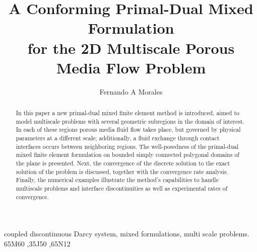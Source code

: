 \documentclass[3p]{elsarticle}
\begin{document}
\begin{frontmatter}

\title{A Conforming Primal-Dual Mixed Formulation \\
for the 
2D Multiscale Porous Media Flow Problem}

\author[mymainaddress]{Fernando A Morales } %



\address[mymainaddress]{Escuela de Matem\'aticas
Universidad Nacional de Colombia, Sede Medell\'in \\
Calle 59 A No 63-20 - Bloque 43, of 106,
Medell\'in - Colombia}




\begin{abstract}
In this paper a new primal-dual mixed finite element method is introduced, aimed to model multiscale problems with several geometric subregions in the domain of interest. In each of these regions porous media fluid flow takes place, but governed by physical parameters at a different scale; additionally, a fluid exchange through contact interfaces occurs between neighboring regions. The well-posedness of the primal-dual mixed finite element formulation on bounded simply connected polygonal domains of the plane is presented. Next, the convergence of the discrete solution to the exact solution of the problem is discussed, together with the convergence rate analysis. Finally, the numerical examples illustrate the method's capabilities to handle multiscale problems and interface discontinuities as well as experimental rates of convergence. 
\end{abstract}

\begin{keyword}
coupled discontinuous Darcy system, mixed formulations, multi scale problems.
\MSC[2010] 65M60 \sep 35J50 \sep 65N12
\end{keyword}

\end{frontmatter}
\end{document}
